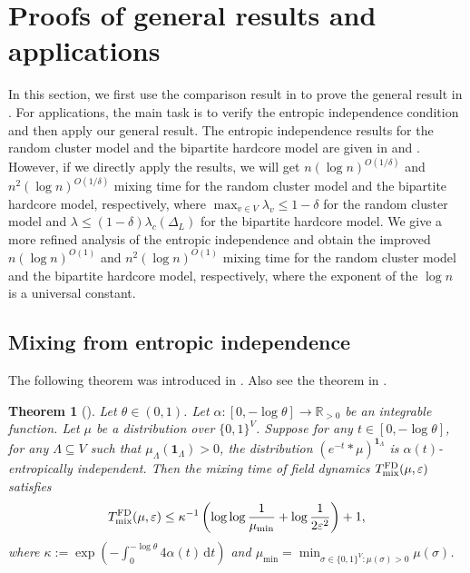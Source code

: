 \documentclass[11pt,a4paper]{article}
\renewcommand{\epsilon}{\varepsilon}
\newcommand{\mixfd}{T_{\textnormal{mix}}^{\textnormal{FD}}}
\newtheorem{theorem}{Theorem}[section]
\theoremstyle{definition}
\renewcommand{\d}{\,\-d}
\def\*#1{\mathbf{#1}} %
\def\-#1{\mathrm{#1}} %
\begin{document}
\section{Proofs of general results and applications}\label{sec:proofs-of-general-results-and-applications}


In this section, we first use the comparison result in  to prove the general result in . For applications, the main task is to verify the entropic independence condition and then apply our general result. The entropic independence results for the random cluster model and the bipartite hardcore model are given in \cite{CZ23} and \cite{Chen0Y23}. However, if we directly apply the results, we will get $n (\log n)^{O(1/\delta)}$ and $n^2 (\log n)^{O(1/\delta)}$ mixing time for the random cluster model and the bipartite hardcore model, respectively, where $\max_{v \in V}\lambda_v \leq 1 - \delta$ for the random cluster model and $\lambda \leq (1-\delta)\lambda_c(\Delta_L)$ for the bipartite hardcore model. We give a more refined analysis of the entropic independence and obtain the improved $n (\log n)^{O(1)}$ and $n^2 (\log n)^{O(1)}$ mixing time for the random cluster model and the bipartite hardcore model, respectively, where the exponent of the $\log n$ is a universal constant.

\subsection{Mixing from entropic independence}\label{sec:proof-GR}

The following theorem was introduced in \cite{ChenE22}. Also see the theorem in \cite{Chen0Y23}.
\begin{theorem}[]\label{thm:SIandMS-KL-Decay}
    Let $\theta\in (0,1)$. Let $\alpha: [0,-\log \theta]\to \mathbb{R}_{> 0}$ be an integrable function. Let $\mu$ be a distribution over $\{0,1\}^V$. 
    Suppose for any $t \in [0,-\log \theta]$, for any $\Lambda \subseteq V$ such that $\mu_{\Lambda}(\*1_\Lambda) > 0$, the distribution $(e^{-t} * \mu)^{\*1_\Lambda}$ is $\alpha(t)$-entropically independent.
    Then the mixing time of field dynamics $\mixfd(\mu,\epsilon)$ satisfies 
    \begin{align*}
        \mixfd(\mu,\epsilon)\leq \kappa^{-1}\left(\log \log \frac{1}{\mu_{\min}} +\log \frac{1}{2\epsilon^2} \right)+1,
    \end{align*}
    where $\kappa:=\exp({-\int_0^{-\log \theta}4\alpha(t)\d t})$ and $\mu_{\min}=\min_{\sigma\in \{0,1\}^V:\mu(\sigma)>0}\mu(\sigma)$.
    \end{theorem}
\end{document}
